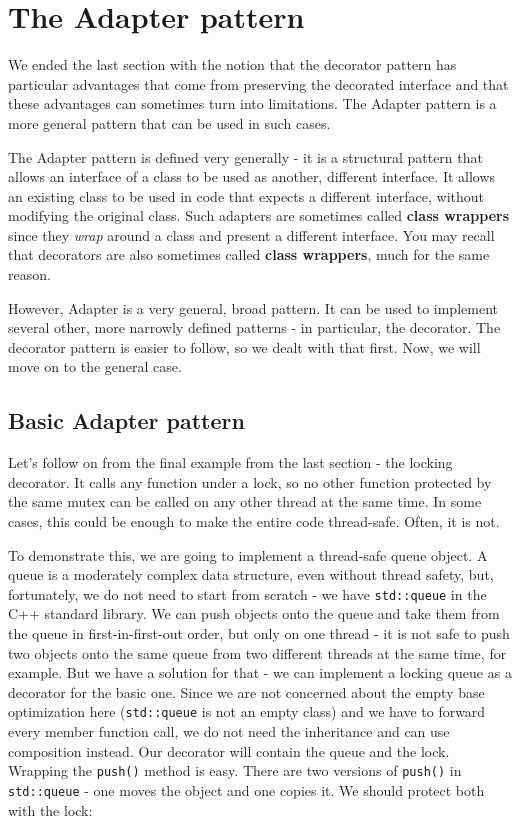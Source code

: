 \section{The Adapter pattern}

We ended the last section with the notion that the decorator pattern has particular advantages that come from preserving the decorated interface and that these advantages can sometimes turn into limitations. The Adapter pattern is a more general pattern that can be used in such cases.

The Adapter pattern is defined very generally - it is a structural pattern that allows an interface of a class to be used as another, different interface. It allows an existing class to be used in code that expects a different interface, without modifying the original class. Such adapters are sometimes called \textbf{class wrappers} since they \emph{wrap} around a class and present a different interface. You may recall that decorators are also sometimes called \textbf{class wrappers}, much for the same reason.

However, Adapter is a very general, broad pattern. It can be used to implement several other, more narrowly defined patterns - in particular, the decorator. The decorator pattern is easier to follow, so we dealt with that first. Now, we will move on to the general case.

\subsection{Basic Adapter pattern}

Let's follow on from the final example from the last section - the locking decorator. It calls any function under a lock, so no other function protected by the same mutex can be called on any other thread at the same time. In some cases, this could be enough to make the entire code thread-safe. Often, it is not.

To demonstrate this, we are going to implement a thread-safe queue object. A queue is a moderately complex data structure, even without thread safety, but, fortunately, we do not need to start from scratch - we have \texttt{std::queue} in the C++ standard library. We can push objects onto the queue and take them from the queue in first-in-first-out order, but only on one thread - it is not safe to push two objects onto the same queue from two different threads at the same time, for example. But we have a solution for that - we can implement a locking queue as a decorator for the basic one. Since we are not concerned about the empty base optimization here (\texttt{std::queue} is not an empty class) and we have to forward every member function call, we do not need the inheritance and can use composition instead. Our decorator will contain the queue and the lock. Wrapping the \texttt{push()} method is easy. There are two versions of \texttt{push()} in \texttt{std::queue} - one moves the object and one copies it. We should protect both with the lock:

